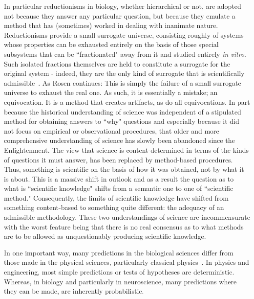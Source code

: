 \documentclass[11pt,3p,twocolumn]{JMN}
\begin{document}
In particular reductionisms in biology, whether hierarchical or not, are adopted not because they answer any particular question, but because they emulate a method that has (sometimes) worked in dealing with inanimate nature. Reductionisms provide a small surrogate universe, consisting roughly of systems whose properties can be exhausted entirely on the basis of those special subsystems that can be ``fractionated" away from it and studied entirely \textit{in vitro}. Such isolated fractions themselves are held to constitute a surrogate for the original system - indeed, they are the only kind of surrogate that is scientifically admissible~\citep{rosen96}. As Rosen continues: This is simply the failure of a small surrogate universe to exhaust the real one. As such, it is essentially a mistake; an equivocation. It is a method that creates artifacts, as do all equivocations. In part because the historical understanding of science was independent of a stipulated method for obtaining answers to ``why" questions and especially because it did not focus on empirical or observational procedures, that  older and more comprehensive understanding of science has slowly been abandoned since the Enlightenment. The view that science is content-determined in terms of the kinds of questions it must answer, has been replaced by method-based procedures. Thus, something is scientific on the basis of how it was obtained, not by what it is about. This is a massive shift in outlook and as a result the question as to what is ``scientific knowledge" shifts from a semantic one to one of ``scientific method." Consequently, the limits of scientific knowledge have shifted from something content-based to something quite different: the adequacy of an admissible methodology. These two understandings of science are incommensurate with the worst feature being that there is no real consensus as to what methods are to be allowed as unquestionably producing scientific knowledge.

In one important way, many predictions in the biological sciences differ from those made in the physical sciences, particularly classical physics~\citep{darwin71}. In physics and engineering, most simple predictions or tests of hypotheses are deterministic. Whereas, in biology and particularly in neuroscience, many predictions where they can be made, are inherently probabilistic.
\end{document}
